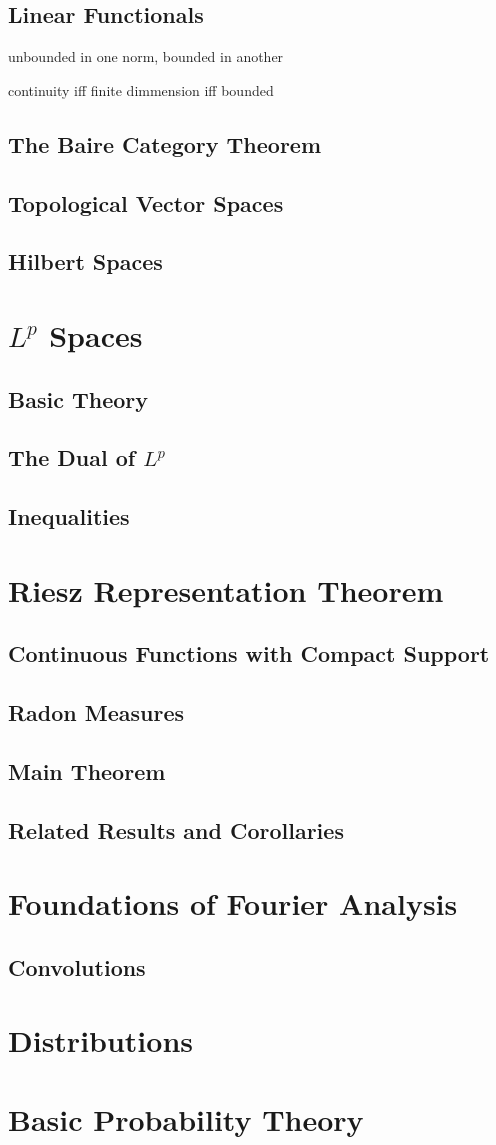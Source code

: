 \documentclass{article}
\theoremstyle{definition}
\begin{document}
	\subsection{Linear Functionals}
	unbounded in one norm, bounded in another %
	
	continuity iff finite dimmension iff bounded
	\subsection{The Baire Category Theorem}
	\subsection{Topological Vector Spaces}
	\subsection{Hilbert Spaces}
	\section{$ L^p $ Spaces}
	\subsection{Basic Theory}
	\subsection{The Dual of $ L^p $}
	\subsection{Inequalities}
	\section{Riesz Representation Theorem}
	\subsection{Continuous Functions with Compact Support}
	\subsection{Radon Measures}
	\subsection{Main Theorem}
	\subsection{Related Results and Corollaries}
	\section{Foundations of Fourier Analysis}
	\subsection{Convolutions}
	\section{Distributions}
	\section{Basic Probability Theory}
	\newpage
	{} 
\end{document}
